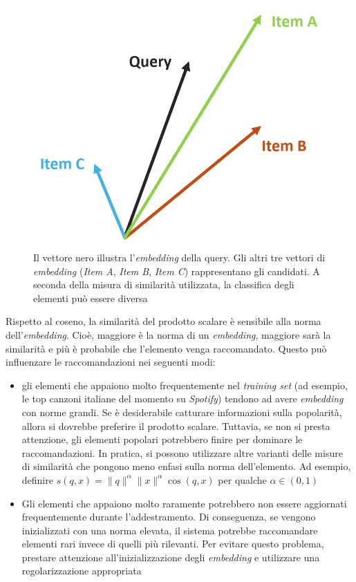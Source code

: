 \begin{figure}[H]
    \centering
    \includegraphics[scale=0.8]{figures/embedding.PNG}
    \caption{Il vettore nero illustra l'\textit{embedding} della query. Gli altri tre vettori di \textit{embedding} (\textit{Item A}, \textit{Item B}, \textit{Item C}) rappresentano gli  candidati. A seconda della misura di similarità utilizzata, la classifica degli elementi può essere diversa}
    \label{fig:embedding}
\end{figure}

Rispetto al coseno, la similarità del prodotto scalare è sensibile alla norma dell'\textit{embedding}. Cioè, maggiore è la norma di un \textit{embedding}, maggiore sarà la similarità e più è probabile che l'elemento venga raccomandato. Questo può influenzare le raccomandazioni nei seguenti modi:

\begin{itemize}
    \item gli elementi che appaiono molto frequentemente nel \textit{training set} (ad esempio, le top canzoni italiane del momento su \textit{Spotify}) tendono ad avere \textit{embedding} con norme grandi. Se è desiderabile catturare informazioni sulla popolarità, allora si dovrebbe preferire il prodotto scalare. Tuttavia, se non si presta attenzione, gli elementi popolari potrebbero finire per dominare le raccomandazioni. In pratica, si possono utilizzare altre varianti delle misure di similarità che pongono meno enfasi sulla norma dell'elemento. Ad esempio, definire $s(q, x) = \|q\|^{\alpha} \|x\|^{\alpha} \cos(q, x)$ per qualche $\alpha \in (0,1)$
    \item Gli elementi che appaiono molto raramente potrebbero non essere aggiornati frequentemente durante l'addestramento. Di conseguenza, se vengono inizializzati con una norma elevata, il sistema potrebbe raccomandare elementi rari invece di quelli più rilevanti. Per evitare questo problema, prestare attenzione all'inizializzazione degli \textit{embedding} e utilizzare una regolarizzazione appropriata
\end{itemize}


